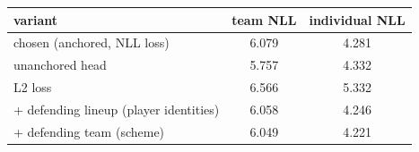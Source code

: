 \begin{tabular}{lcc}
\hline
variant & team NLL & individual NLL \\
\hline
chosen (anchored, NLL loss) & 6.079 & 4.281 \\
unanchored head & 5.757 & 4.332 \\
L2 loss & 6.566 & 5.332 \\
+ defending lineup (player identities) & 6.058 & 4.246 \\
+ defending team (scheme) & 6.049 & 4.221 \\
\hline
\end{tabular}
